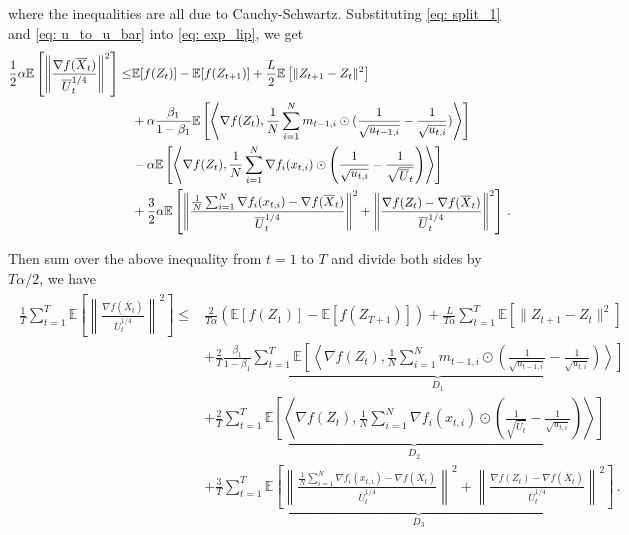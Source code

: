 \documentclass[anon,12pt]{colt2021} %
\begin{document}
where the inequalities are all due to Cauchy-Schwartz.
Substituting \eqref{eq: split_1} and \eqref{eq: u_to_u_bar} into \eqref{eq: exp_lip}, we get
\begin{align}
\begin{split}\notag
\frac{1}{2} \alpha \mathbb E \left [\left\|\frac{\nabla f( \overline X_{t})}{\overline U_{t}^{1/4}}\right\|^2  \right]
\leq & \mathbb E  [f( Z_{t})]  -  \mathbb E [f( Z_{t+1})] + \frac{L}{2} \mathbb E\left[\| Z_{t+1}-  Z_{t}\|^2 \right] \nonumber  \\
&+ \alpha \frac{\beta_1}{1-\beta_1}  \mathbb E \left [\left \langle \nabla f( Z_{t}) , \frac{1}{N} \sum_{i=1}^N m_{t-1	,i} \odot (\frac{1}{\sqrt{u_{t-1,i}}} - \frac{1}{\sqrt{u_{t,i}}}) \right \rangle \right] \nonumber \\
& - \alpha \mathbb E \left [ \left \langle \nabla f( Z_{t}), \frac{1}{N} \sum_{i=1}^N \nabla f_i( x_{t,i})\odot \left(\frac{1}{\sqrt{u_{t,i}}} - \frac{1}{\sqrt{\overline U_{t}}}  \right)  \right \rangle \right] \nonumber \\
& + \frac{3}{2} \alpha \mathbb E \left [ \left\|  \frac{ \frac{1}{N}\sum_{i=1}^N \nabla f_i( x_{t,i}) -  \nabla f( \overline X_{t})}{\overline U_{t}^{1/4}}  \right\|^2 + \left\|\frac{\nabla f( Z_{t}) -\nabla f( \overline X_{t})}{\overline U_{t}^{1/4}}\right\|^2 \right] \, .
\end{split}
\end{align}



Then sum over the above inequality from $t= 1$ to $T$ and divide both sides by $T\alpha/2$, we have
\begin{align}\label{eq: exp_telescope}
\begin{split}
 \frac{1}{T}\sum_{t=1}^T  \mathbb E \left [\left\|\frac{\nabla f( \overline X_{t})}{\overline U_{t}^{1/4}}\right\|^2  \right] \leq & \frac{2}{T\alpha} ( \mathbb E  [f( Z_{1})]  -  \mathbb E [f( Z_{T+1})]) + \frac{L}{T\alpha} \sum_{t=1}^T\mathbb E\left[\| Z_{t+1}-  Z_{t}\|^2 \right]   \\
&+ \frac{2}{T}\frac{\beta_1}{1-\beta_1} \underbrace{\sum_{t=1}^T   \mathbb E \left [\left \langle \nabla f( Z_{t}) , \frac{1}{N} \sum_{i=1}^N m_{t-1	,i} \odot (\frac{1}{\sqrt{u_{t-1,i}}} - \frac{1}{\sqrt{u_{t,i}}}) \right \rangle \right]}_{D_1}  \\
& + \frac{2}{T} \underbrace{\sum_{t=1}^T \mathbb E \left [ \left \langle \nabla f( Z_{t}), \frac{1}{N} \sum_{i=1}^N \nabla f_i( x_{t,i})\odot \left( \frac{1}{\sqrt{\overline U_{t}}} -\frac{1}{\sqrt{u_{t,i}}}  \right)  \right \rangle \right] }_{D_2} \\
& + \frac{3}{T} \underbrace{\sum_{t=1}^T \mathbb E \left [ \left\|  \frac{ \frac{1}{N}\sum_{i=1}^N \nabla f_i( x_{t,i}) -  \nabla f( \overline X_{t})}{\overline U_{t}^{1/4}}  \right\|^2 + \left\|\frac{\nabla f( Z_{t}) -\nabla f( \overline X_{t})}{\overline U_{t}^{1/4}}\right\|^2 \right]}_{D_3} \, .
\end{split}
\end{align}
\end{document}
